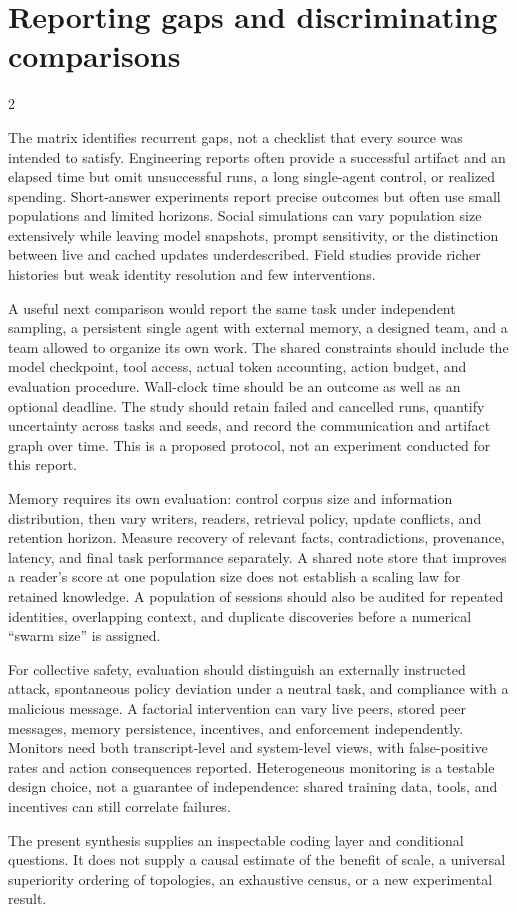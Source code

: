 \section{Reporting gaps and discriminating comparisons}
\label{app:gaps}
\begin{multicols}{2}\raggedcolumns

The matrix identifies recurrent gaps, not a checklist that every source was intended to satisfy. Engineering reports often provide a successful artifact and an elapsed time but omit unsuccessful runs, a long single-agent control, or realized spending. Short-answer experiments report precise outcomes but often use small populations and limited horizons. Social simulations can vary population size extensively while leaving model snapshots, prompt sensitivity, or the distinction between live and cached updates underdescribed. Field studies provide richer histories but weak identity resolution and few interventions.

A useful next comparison would report the same task under independent sampling, a persistent single agent with external memory, a designed team, and a team allowed to organize its own work. The shared constraints should include the model checkpoint, tool access, actual token accounting, action budget, and evaluation procedure. Wall-clock time should be an outcome as well as an optional deadline. The study should retain failed and cancelled runs, quantify uncertainty across tasks and seeds, and record the communication and artifact graph over time. This is a proposed protocol, not an experiment conducted for this report.

Memory requires its own evaluation: control corpus size and information distribution, then vary writers, readers, retrieval policy, update conflicts, and retention horizon. Measure recovery of relevant facts, contradictions, provenance, latency, and final task performance separately. A shared note store that improves a reader's score at one population size does not establish a scaling law for retained knowledge. A population of sessions should also be audited for repeated identities, overlapping context, and duplicate discoveries before a numerical ``swarm size'' is assigned.

For collective safety, evaluation should distinguish an externally instructed attack, spontaneous policy deviation under a neutral task, and compliance with a malicious message. A factorial intervention can vary live peers, stored peer messages, memory persistence, incentives, and enforcement independently. Monitors need both transcript-level and system-level views, with false-positive rates and action consequences reported. Heterogeneous monitoring is a testable design choice, not a guarantee of independence: shared training data, tools, and incentives can still correlate failures.

The present synthesis supplies an inspectable coding layer and conditional questions. It does not supply a causal estimate of the benefit of scale, a universal superiority ordering of topologies, an exhaustive census, or a new experimental result.
\end{multicols}

